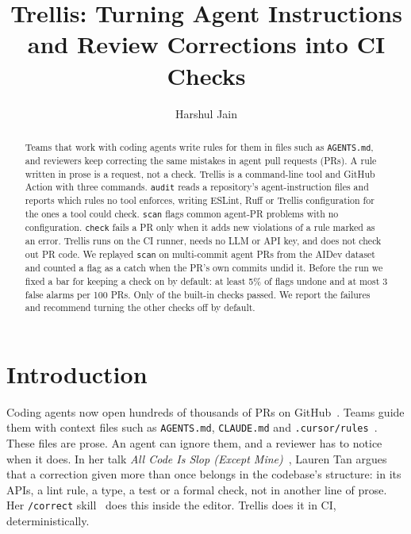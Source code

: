 \documentclass[sigconf]{acmart}
\begin{document}
\sloppy
\title{Trellis: Turning Agent Instructions and Review Corrections into CI Checks}
\author{Harshul Jain}
\begin{abstract}
Teams that work with coding agents write rules for them in files such as \texttt{AGENTS.md}, and reviewers keep correcting the same mistakes in agent pull requests (PRs). A rule written in prose is a request, not a check. Trellis is a command-line tool and GitHub Action with three commands. \texttt{audit} reads a repository's agent-instruction files and reports which rules no tool enforces, writing ESLint, Ruff or Trellis configuration for the ones a tool could check. \texttt{scan} flags common agent-PR problems with no configuration. \texttt{check} fails a PR only when it adds new violations of a rule marked as an error. Trellis runs on the CI runner, needs no LLM or API key, and does not check out PR code. We replayed \texttt{scan} on \nPRs{} multi-commit agent PRs from the AIDev dataset and counted a flag as a catch when the PR's own commits undid it. Before the run we fixed a bar for keeping a check on by default: at least 5\% of flags undone and at most 3 false alarms per 100 PRs. Only \nPass{} of the \nChecks{} built-in checks passed. We report the failures and recommend turning the other checks off by default.
\end{abstract}
\maketitle

\section{Introduction}
Coding agents now open hundreds of thousands of PRs on GitHub~\cite{li2026aidev}. Teams guide them with context files such as \texttt{AGENTS.md}, \texttt{CLAUDE.md} and \texttt{.cursor/rules}~\cite{chatlatanagulchai2025agentreadmes}. These files are prose. An agent can ignore them, and a reviewer has to notice when it does. In her talk \emph{All Code Is Slop (Except Mine)}~\cite{tan2026slop}, Lauren Tan argues that a correction given more than once belongs in the codebase's structure: in its APIs, a lint rule, a type, a test or a formal check, not in another line of prose. Her \texttt{/correct} skill~\cite{pstack} does this inside the editor. Trellis does it in CI, deterministically.
\end{document}
